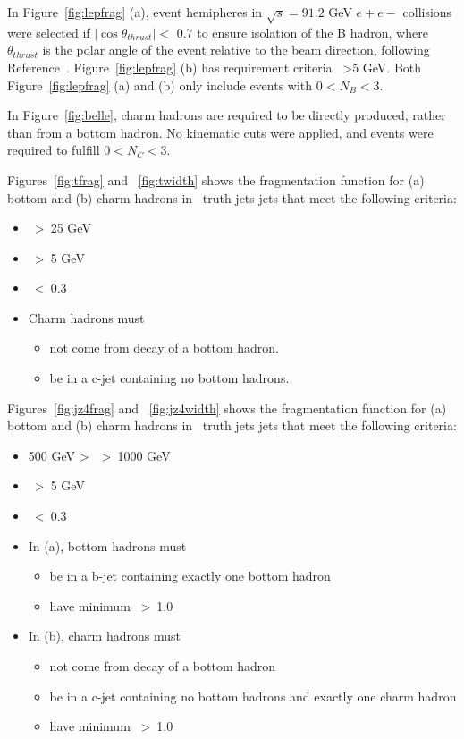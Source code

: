 In Figure~\ref{fig:lepfrag} (a), event hemipheres in $\sqrt{s}=91.2$ GeV $e+e-$ collisions were selected if $|\cos{\theta}_{thrust}|<$ 0.7 to ensure isolation of the B hadron, where $\theta_{thrust}$ is the polar angle of the event relative to the beam direction, following Reference~\cite{DELPHI}. Figure~\ref{fig:lepfrag} (b) has requirement criteria \ptHad\ \textgreater 5 GeV. Both Figure~\ref{fig:lepfrag} (a) and (b) 
only include events with $0 < N_{B}  < 3$.

In Figure~\ref{fig:belle}, charm hadrons are required to be directly produced, rather than from a bottom hadron. No kinematic cuts were applied, and events were required to fulfill $0 < N_{C}  < 3$.

Figures~\ref{fig:tfrag} and ~\ref{fig:twidth} shows the fragmentation function for (a) bottom and (b) charm hadrons in  \antiktfour\ truth jets jets that meet the following criteria:
\begin{itemize}
\item \ptJet\ \textgreater~25 GeV
\item \ptHad\ \textgreater~5 GeV
\item \drHadJet\ \textless~0.3
\item Charm hadrons must 
\begin{itemize}
\item not come from decay of a bottom hadron.
\item be in a c-jet containing no bottom hadrons.
\end{itemize}
\end{itemize}

Figures~\ref{fig:jz4frag} and ~\ref{fig:jz4width} shows the fragmentation function for (a) bottom and (b) charm hadrons in  \antiktfour\ truth jets jets that meet the following criteria:
\begin{itemize}
\item 500 GeV \textgreater~\ptJet\ \textgreater~1000 GeV
\item \ptHad\ \textgreater~5 GeV
\item \drHadJet\ \textless~0.3
\item In (a), bottom hadrons must 
\begin{itemize}
\item be in a b-jet containing exactly one bottom hadron
\item have minimum \drBB\ \textgreater~1.0 %
\end{itemize}
\item In (b), charm hadrons must 
\begin{itemize}
\item not come from decay of a bottom hadron
\item be in a c-jet containing no bottom hadrons and exactly one charm hadron
\item have minimum \drCC\ \textgreater~1.0 %
\end{itemize}
\end{itemize}

